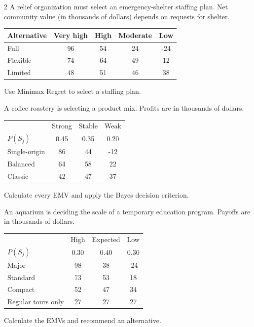 \begin{multicols}{2}
		A relief organization must select an emergency-shelter staffing plan. Net community value (in thousands of dollars) depends on requests for shelter.\vspace{-3mm}
		\begin{center}\setlength{\tabcolsep}{2pt}\renewcommand{\arraystretch}{1.1}
			\begin{tabular}{lcccc}\toprule
			Alternative & Very high & High & Moderate & Low\\ \midrule
			Full&96&54&24&-24\\
			Flexible&74&64&49&12\\
			Limited&48&51&46&38\\ \bottomrule
			\end{tabular}
			\end{center}\vspace{-3mm}
		Use Minimax Regret to select a staffing plan.\vspace{-3mm}

		A coffee roastery is selecting a product mix. Profits are in thousands of dollars.\vspace{-3mm}
		\begin{center}\setlength{\tabcolsep}{2pt}\renewcommand{\arraystretch}{1.1}
			\begin{tabular}{lccc}\toprule
			&Strong&Stable&Weak\\
			$P(S_j)$&0.45&0.35&0.20\\ \midrule
			Single-origin&86&44&-12\\
			Balanced&64&58&22\\
			Classic&42&47&37\\ \bottomrule
			\end{tabular}
		\end{center}\vspace{-3mm}
		Calculate every EMV and apply the Bayes decision criterion.\vspace{-3mm}

		An aquarium is deciding the scale of a temporary education program. Payoffs are in thousands of dollars.\vspace{-3mm}
		\begin{center}\setlength{\tabcolsep}{2pt}\renewcommand{\arraystretch}{1.1}
			\begin{tabular}{lccc}\toprule
			&High&Expected&Low\\
			$P(S_j)$&0.30&0.40&0.30\\ \midrule
			Major&98&38&-24\\
			Standard&73&53&18\\
			Compact&52&47&34\\
			Regular tours only&27&27&27\\ \bottomrule
			\end{tabular}
		\end{center}\vspace{-3mm}
		Calculate the EMVs and recommend an alternative.\vspace{-3mm}


\end{multicols}
